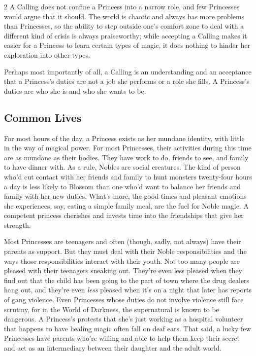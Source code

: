 \begin{multicols}{2}
A Calling does not confine a Princess into a narrow role, and few Princesses would argue that it should. The world is chaotic and always has more problems than Princesses, so the ability to step outside one's comfort zone to deal with a different kind of crisis is always praiseworthy; while accepting a Calling makes it easier for a Princess to learn certain types of magic, it does nothing to hinder her exploration into other types. 

Perhaps most importantly of all, a Calling is an understanding and an acceptance that a Princess's duties are not a job she performs or a role she fills. A Princess's duties are who she is and who she wants to be. 

\subsection*{Common Lives}

For most hours of the day, a Princess exists as her mundane identity, with little in the way of magical power. For most Princesses, their activities during this time are as mundane as their bodies. They have work to do, friends to see, and family to have dinner with. As a rule, Nobles are social creatures. The kind of person who'd cut contact with her friends and family to hunt monsters twenty-four hours a day is less likely to Blossom than one who'd want to balance her friends and family with her new duties. What's more, the good times and pleasant emotions she experiences, say, eating a simple family meal, are the fuel for Noble magic. A competent princess cherishes and invests time into the friendships that give her strength. 

Most Princesses are teenagers and often (though, sadly, not always) have their parents as support. But they must deal with their Noble responsibilities and the ways those responsibilities interact with their youth. Not too many people are pleased with their teenagers sneaking out. They're even less pleased when they find out that the child has been going to the part of town where the drug dealers hang out, and they're even \textit{less} pleased when it's on a night that later has reports of gang violence. Even Princesses whose duties do not involve violence still face scrutiny, for in the World of Darkness, the supernatural is known to be dangerous. A Princess's protests that she's just working as a hospital volunteer that happens to have healing magic often fall on deaf ears. That said, a lucky few Princesses have parents who're willing and able to help them keep their secret and act as an intermediary between their daughter and the adult world. 


\end{multicols}
